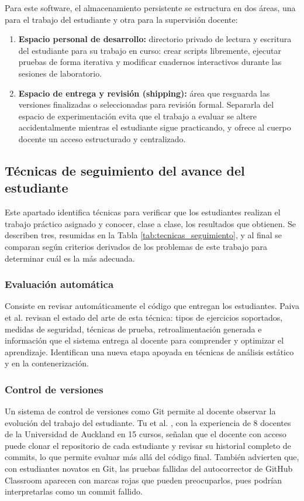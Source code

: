 Para este software, el almacenamiento persistente se estructura en dos áreas, una para el trabajo del estudiante y otra para la supervisión docente:

\begin{enumerate}
    \item \textbf{Espacio personal de desarrollo:} directorio privado de lectura y escritura del estudiante para su trabajo en curso: crear scripts libremente, ejecutar pruebas de forma iterativa y modificar cuadernos interactivos durante las sesiones de laboratorio.
    \item \textbf{Espacio de entrega y revisión (shipping):} área que resguarda las versiones finalizadas o seleccionadas para revisión formal. Separarla del espacio de experimentación evita que el trabajo a evaluar se altere accidentalmente mientras el estudiante sigue practicando, y ofrece al cuerpo docente un acceso estructurado y centralizado.
\end{enumerate}

\subsection{Técnicas de seguimiento del avance del estudiante}
\label{subsec:tecnicas_seguimiento}

Este apartado identifica técnicas para verificar que los estudiantes realizan el trabajo práctico asignado y conocer, clase a clase, los resultados que obtienen. Se describen tres, resumidas en la Tabla \ref{tab:tecnicas_seguimiento}, y al final se comparan según criterios derivados de los problemas de este trabajo para determinar cuál es la más adecuada.

\subsubsection{Evaluación automática}
Consiste en revisar automáticamente el código que entregan los estudiantes. Paiva et al. \cite{paiva2022automated} revisan el estado del arte de esta técnica: tipos de ejercicios soportados, medidas de seguridad, técnicas de prueba, retroalimentación generada e información que el sistema entrega al docente para comprender y optimizar el aprendizaje. Identifican una nueva etapa apoyada en técnicas de análisis estático y en la contenerización.

\subsubsection{Control de versiones}
Un sistema de control de versiones como Git permite al docente observar la evolución del trabajo del estudiante. Tu et al. \cite{tu2022github}, con la experiencia de 8 docentes de la Universidad de Auckland en 15 cursos, señalan que el docente con acceso puede clonar el repositorio de cada estudiante y revisar su historial completo de commits, lo que permite evaluar más allá del código final. También advierten que, con estudiantes novatos en Git, las pruebas fallidas del autocorrector de GitHub Classroom aparecen con marcas rojas que pueden preocuparlos, pues podrían interpretarlas como un commit fallido.

